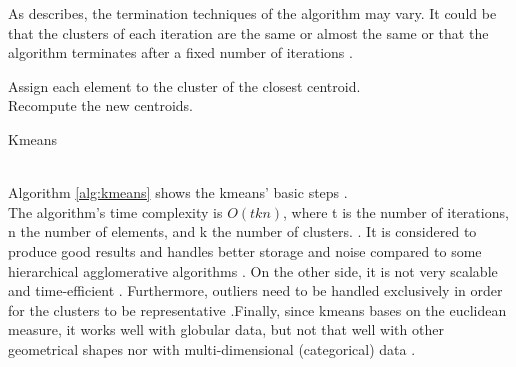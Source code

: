 As \textcite{dunham} describes, the termination techniques of the algorithm may vary. It could be that the clusters of each iteration are the same or almost the same or that the algorithm terminates after a fixed number of iterations \autocite[140]{dunham}.
\begin{algorithm}
\SetAlgoLined
{}
{
Assign each element to the cluster of the closest centroid.\\
Recompute the new centroids.
}
\caption{Kmeans}\label{alg:kmeans}
\end{algorithm} \\
Algorithm \ref{alg:kmeans} shows the kmeans' basic steps \autocite{dunham, tanSteinKum}. \\
The algorithm's time complexity is \(O(tkn)\), where t is the number of iterations, n the number of elements, and k the number of clusters. \autocite[141]{dunham}. It is considered to produce good results and handles better storage and noise compared to some hierarchical agglomerative algorithms \autocite[526]{tanSteinKum}. On the other side, it is not very scalable and time-efficient \autocite[141]{dunham}. Furthermore, outliers need to be handled exclusively in order for the clusters to be representative \autocite[506]{tanSteinKum}.Finally, since kmeans bases on the euclidean measure, it works well with globular data, but not that well with other geometrical shapes nor with multi-dimensional (categorical) data \autocite[647, 649]{survey}.

